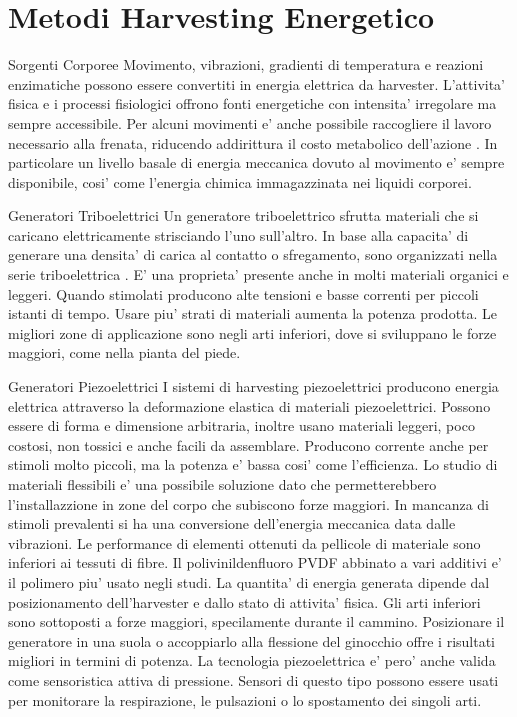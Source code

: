 \chapter{Metodi Harvesting Energetico}

\begin{section}{Sorgenti Corporee}
   Movimento, vibrazioni, gradienti di temperatura e reazioni enzimatiche possono essere convertiti in energia elettrica da harvester. L'attivita' fisica e i processi fisiologici offrono fonti energetiche con intensita' irregolare ma sempre accessibile. Per alcuni movimenti e' anche possibile raccogliere il lavoro necessario alla frenata, riducendo addirittura il costo metabolico dell'azione \cite{liuBiomechanicalEnergyHarvesting2022}. In particolare un livello basale di energia meccanica dovuto al movimento e' sempre disponibile, cosi' come l'energia chimica immagazzinata nei liquidi corporei.
   
   \begin{subsection}{Generatori Triboelettrici}
    Un generatore triboelettrico sfrutta materiali che si caricano elettricamente strisciando l'uno sull'altro. In base alla capacita' di generare una densita' di carica al contatto o sfregamento, sono organizzati nella serie triboelettrica \cite{zouQuantifyingTriboelectricSeries2019}. E' una proprieta' presente anche in molti materiali organici e leggeri. Quando stimolati producono alte tensioni e basse correnti per piccoli istanti di tempo. Usare piu' strati di materiali aumenta la potenza prodotta. Le migliori zone di applicazione sono negli arti inferiori, dove si sviluppano le forze maggiori, come nella pianta del piede.
   \end{subsection}

   \begin{subsection}{Generatori Piezoelettrici}
    I sistemi di harvesting piezoelettrici producono energia elettrica attraverso la deformazione elastica di materiali piezoelettrici. Possono essere di forma e dimensione arbitraria, inoltre usano materiali leggeri, poco costosi, non tossici e anche facili da assemblare. Producono corrente anche per stimoli molto piccoli, ma la potenza e' bassa cosi' come l'efficienza. Lo studio di materiali flessibili e' una possibile soluzione dato che permetterebbero l'installazzione in zone del corpo che subiscono forze maggiori. In mancanza di stimoli prevalenti si ha una conversione dell'energia meccanica data dalle vibrazioni. Le performance di elementi ottenuti da pellicole di materiale sono inferiori ai tessuti di fibre. Il polivinildenfluoro PVDF abbinato a vari additivi e' il polimero piu' usato negli studi. La quantita' di energia generata dipende dal posizionamento dell'harvester e dallo stato di attivita' fisica. Gli arti inferiori sono sottoposti a forze maggiori, specilamente durante il cammino. Posizionare il generatore in una suola o accoppiarlo alla flessione del ginocchio offre i risultati migliori in termini di potenza. La tecnologia piezoelettrica e' pero' anche valida come sensoristica attiva di pressione. Sensori di questo tipo possono essere usati per monitorare la respirazione, le pulsazioni o lo spostamento dei singoli arti.
   \end{subsection}


\end{section}
